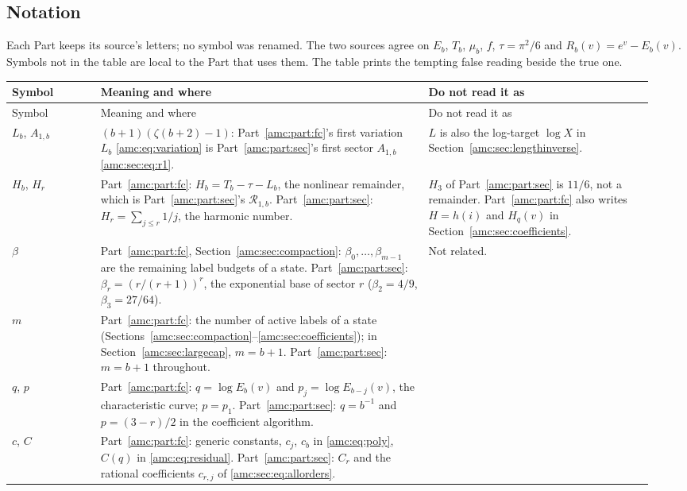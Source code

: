 \documentclass[11pt,letterpaper]{article}
\theoremstyle{remark}\newtheorem{remark}[theorem]{Remark}
\newcommand{\RR}{\mathcal R}
\begin{document}
\subsection*{Notation}
\label{amc:guide:notation}
Each Part keeps its source's letters; no symbol was renamed. The two sources agree on $E_b$, $T_b$, $\mu_b$, $f$, $\tau=\pi^2/6$ and $R_b(v)=e^v-E_b(v)$. Symbols not in the table are local to the Part that uses them. The table prints the tempting false reading beside the true one.

{\small
\begin{longtable}{@{}>{\raggedright\arraybackslash}p{0.13\linewidth}>{\raggedright\arraybackslash}p{0.48\linewidth}>{\raggedright\arraybackslash}p{0.33\linewidth}@{}}
\toprule
Symbol & Meaning and where & Do not read it as\\
\midrule
\endfirsthead
\toprule
Symbol & Meaning and where & Do not read it as\\
\midrule
\endhead
\bottomrule
\endfoot
$L_b$, $A_{1,b}$ & $(b+1)(\zeta(b+2)-1)$: Part~\ref{amc:part:fc}'s first variation $L_b$ \eqref{amc:eq:variation} is Part~\ref{amc:part:sec}'s first sector $A_{1,b}$ \eqref{amc:sec:eq:r1}. & $L$ is also the log-target $\log X$ in Section~\ref{amc:sec:lengthinverse}.\\
$H_b$, $H_r$ & Part~\ref{amc:part:fc}: $H_b=T_b-\tau-L_b$, the nonlinear remainder, which is Part~\ref{amc:part:sec}'s $\RR_{1,b}$. Part~\ref{amc:part:sec}: $H_r=\sum_{j\le r}1/j$, the harmonic number. & $H_3$ of Part~\ref{amc:part:sec} is $11/6$, not a remainder. Part~\ref{amc:part:fc} also writes $H=h(i)$ and $H_q(v)$ in Section~\ref{amc:sec:coefficients}.\\
$\beta$ & Part~\ref{amc:part:fc}, Section~\ref{amc:sec:compaction}: $\beta_0,\ldots,\beta_{m-1}$ are the remaining label budgets of a state. Part~\ref{amc:part:sec}: $\beta_r=(r/(r+1))^r$, the exponential base of sector $r$ ($\beta_2=4/9$, $\beta_3=27/64$). & Not related.\\
$m$ & Part~\ref{amc:part:fc}: the number of active labels of a state (Sections~\ref{amc:sec:compaction}--\ref{amc:sec:coefficients}); in Section~\ref{amc:sec:largecap}, $m=b+1$. Part~\ref{amc:part:sec}: $m=b+1$ throughout. & \\
$q$, $p$ & Part~\ref{amc:part:fc}: $q=\log E_b(v)$ and $p_j=\log E_{b-j}(v)$, the characteristic curve; $p=p_1$. Part~\ref{amc:part:sec}: $q=b^{-1}$ and $p=(3-r)/2$ in the coefficient algorithm. & \\
$c$, $C$ & Part~\ref{amc:part:fc}: generic constants, $c_j$, $c_b$ in \eqref{amc:eq:poly}, $C(q)$ in \eqref{amc:eq:residual}. Part~\ref{amc:part:sec}: $C_r$ and the rational coefficients $c_{r,j}$ of \eqref{amc:sec:eq:allorders}. & \\

\end{longtable}}
\end{document}
